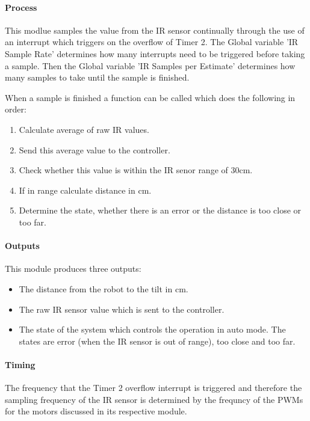 \documentclass[MTRX3700report.tex]{subfiles}
\begin{document}
\paragraph{Process}

This modlue samples the value from the IR sensor continually through the use of an interrupt which triggers on the overflow of Timer 2. The Global variable 'IR Sample Rate' determines how many interrupts need to be triggered before taking a sample. Then the  Global variable 'IR Samples per Estimate' determines how many samples to take until the sample is finished.

When a sample is finished a function can be called which does the following in order:
\begin{enumerate}
	\item Calculate average of raw IR values. 
	\item Send this average value to the controller. 
	\item Check whether this value is within the IR senor range of 30cm.	
	\item If in range calculate distance in cm.
	\item Determine the state, whether there is an error or the distance is too close or too far.
\end{enumerate}
 
\paragraph{Outputs}
This module produces three outputs:
\begin{itemize}
		\item The distance from the robot to the tilt in cm.
		\item The raw IR sensor value which is sent to the controller.
		\item The state of the system which controls the operation in auto mode. The states are error (when the IR sensor is out of range), too close and too far.
\end{itemize}
  
\paragraph{Timing}
The frequency that the Timer 2 overflow interrupt is triggered and therefore the sampling frequency of the IR sensor is determined by the frequncy of the PWMs for the motors discussed in its respective module. 
\end{document}
